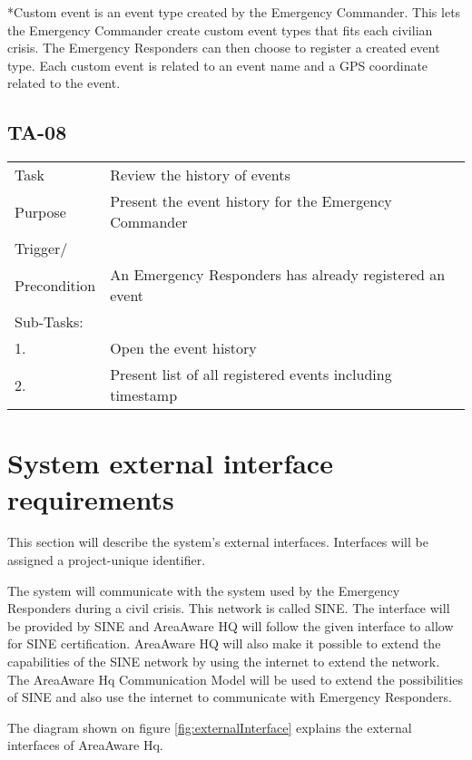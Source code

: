 *Custom event is an event type created by the Emergency Commander. This lets the Emergency Commander create custom event types that fits each civilian crisis. The Emergency Responders can then choose to register a created event type. Each custom event is related to an event name and a GPS coordinate related to the event.

\subsection{TA-08}

\begin{longtable}{| p{2.5cm}  | p{10cm} |  }
	\hline
	Task & Review the history of events \\
	Purpose & Present the event history for the Emergency Commander \\
	Trigger/ &  \\ Precondition & An Emergency Responders has already registered an event \\
	\hline
	Sub-Tasks: & \\
	1. & Open the event history \\
	2. & Present list of all registered events including timestamp  \\
	\hline
\end{longtable}

\FloatBarrier
\newpage

\label{sec_nonFunc1}
\section{System external interface requirements}
This section will describe the system’s external interfaces. Interfaces will be assigned a project-unique identifier. 

The system will communicate with the system used by the Emergency Responders during a civil crisis. This network is called SINE. The interface will be provided by SINE and AreaAware HQ will follow the given interface to allow for SINE certification. AreaAware HQ will also make it possible to extend the capabilities of the SINE network by using the internet to extend the network. The AreaAware Hq Communication Model will be used to extend the possibilities of SINE and also use the internet to communicate with Emergency Responders.

The diagram shown on figure \ref{fig:externalInterface} explains the external interfaces of AreaAware Hq.


